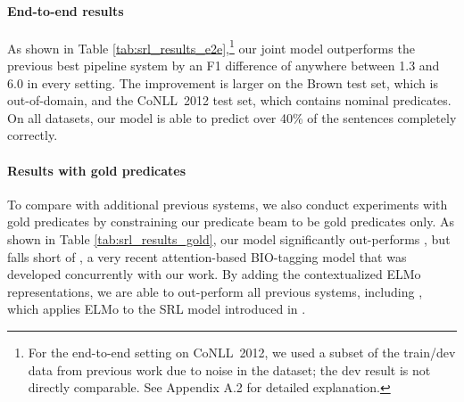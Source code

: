 \documentclass[11pt,a4paper]{article}
\begin{document}
\paragraph{End-to-end results}
As shown in Table \ref{tab:srl_results_e2e},\footnote{For the end-to-end setting on CoNLL~2012, we used a subset of the train/dev data from previous work due to noise in the dataset; the dev result is not directly comparable. See Appendix A.2 for detailed explanation.} our joint model outperforms the previous best pipeline system \cite{He2017DeepSR} by an F1 difference of anywhere between 1.3 and 6.0 in every setting. 
The improvement is larger on the Brown test set, which is out-of-domain, and the CoNLL~2012 test set, which contains nominal predicates.
On all datasets, our model is able to predict over 40\% of the sentences completely correctly.

\paragraph{Results with gold predicates}
To compare with additional previous systems, we also conduct experiments with gold predicates by constraining our predicate beam to be gold predicates only.
As shown in Table \ref{tab:srl_results_gold}, our model significantly out-performs , but falls short of , a very recent attention-based \cite{vaswani2017attention} BIO-tagging model that was developed concurrently with our work.
By adding the contextualized ELMo representations, we are able to out-perform all previous systems, including , which applies ELMo to the SRL model introduced in .
\end{document}
